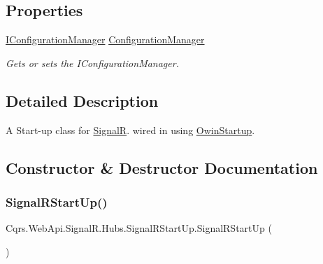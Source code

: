 \subsection*{Properties}
\begin{DoxyCompactItemize}
\item 
\hyperlink{interfaceCqrs_1_1Configuration_1_1IConfigurationManager}{I\+Configuration\+Manager} \hyperlink{classCqrs_1_1WebApi_1_1SignalR_1_1Hubs_1_1SignalRStartUp_a0c137e0c86431dc944d7a3415de011bb_a0c137e0c86431dc944d7a3415de011bb}{Configuration\+Manager}
\begin{DoxyCompactList}\small\item\em Gets or sets the I\+Configuration\+Manager. \end{DoxyCompactList}\end{DoxyCompactItemize}


\subsection{Detailed Description}
A Start-\/up class for \hyperlink{namespaceCqrs_1_1WebApi_1_1SignalR}{SignalR}. wired in using \hyperlink{}{Owin\+Startup}. 



\subsection{Constructor \& Destructor Documentation}
\mbox{\label{classCqrs_1_1WebApi_1_1SignalR_1_1Hubs_1_1SignalRStartUp_a5d042d52b0c5671b7be52f69c05ec371_a5d042d52b0c5671b7be52f69c05ec371}} 
\subsubsection{\texorpdfstring{Signal\+R\+Start\+Up()}{SignalRStartUp()}\hspace{0.1cm}{\footnotesize\ttfamily [1/2]}}
{\footnotesize\ttfamily Cqrs.\+Web\+Api.\+Signal\+R.\+Hubs.\+Signal\+R\+Start\+Up.\+Signal\+R\+Start\+Up (\begin{DoxyParamCaption}{ }\end{DoxyParamCaption})}



